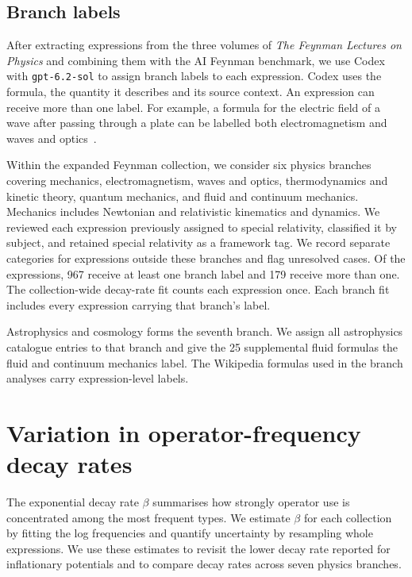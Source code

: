 \documentclass[10pt]{article}
\begin{document}
\subsection{Branch labels}
After extracting expressions from the three volumes of \textit{The Feynman Lectures on Physics} and combining them with the AI Feynman benchmark, we use Codex with \texttt{gpt-6.2-sol} to assign branch labels to each expression. Codex uses the formula, the quantity it describes and its source context. An expression can receive more than one label. For example, a formula for the electric field of a wave after passing through a plate can be labelled both electromagnetism and waves and optics~\citep[Vol.~I, Eq.~(31.5)]{feynman}.

Within the expanded Feynman collection, we consider six physics branches covering mechanics, electromagnetism, waves and optics, thermodynamics and kinetic theory, quantum mechanics, and fluid and continuum mechanics. Mechanics includes Newtonian and relativistic kinematics and dynamics. We reviewed each expression previously assigned to special relativity, classified it by subject, and retained special relativity as a framework tag. We record separate categories for expressions outside these branches and flag unresolved cases. Of the \nFeynAll{} expressions, 967 receive at least one branch label and 179 receive more than one. The collection-wide decay-rate fit counts each expression once. Each branch fit includes every expression carrying that branch's label.

Astrophysics and cosmology forms the seventh branch. We assign all astrophysics catalogue entries to that branch and give the 25 supplemental fluid formulas the fluid and continuum mechanics label. The Wikipedia formulas used in the branch analyses carry expression-level labels.

\section{Variation in operator-frequency decay rates}\label{sec:decay}

The exponential decay rate $\beta$ summarises how strongly operator use is concentrated among the most frequent types. We estimate $\beta$ for each collection by fitting the log frequencies and quantify uncertainty by resampling whole expressions. We use these estimates to revisit the lower decay rate reported for inflationary potentials and to compare decay rates across seven physics branches.
\end{document}
